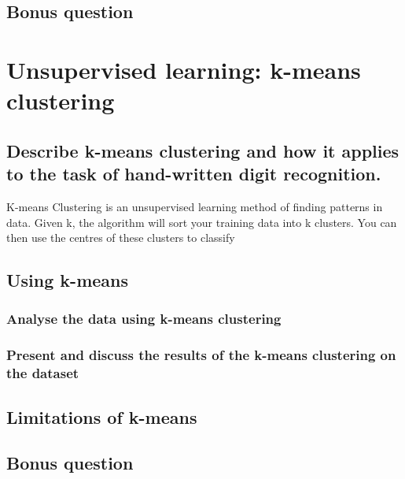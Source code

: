 \documentclass[11pt,a4paper,twoside]{article}
\begin{document}
    \subsection{Bonus question}
    
    
    \section{Unsupervised learning: k-means clustering}
    \subsection{Describe k-means clustering and how it applies to the task of hand-written digit recognition.}
    K-means Clustering is an unsupervised learning method of finding patterns in data. Given k, the 
    algorithm will sort your training data into k clusters. You can then use the centres of these clusters to classify 
    
    
    \subsection{Using k-means}
    \subsubsection{Analyse the data using k-means clustering}
    
    \subsubsection{Present and discuss the results of the k-means clustering on the dataset}
    
    
    \subsection{Limitations of k-means}
    
    
    \subsection{Bonus question}
    
    
  
\end{document}
